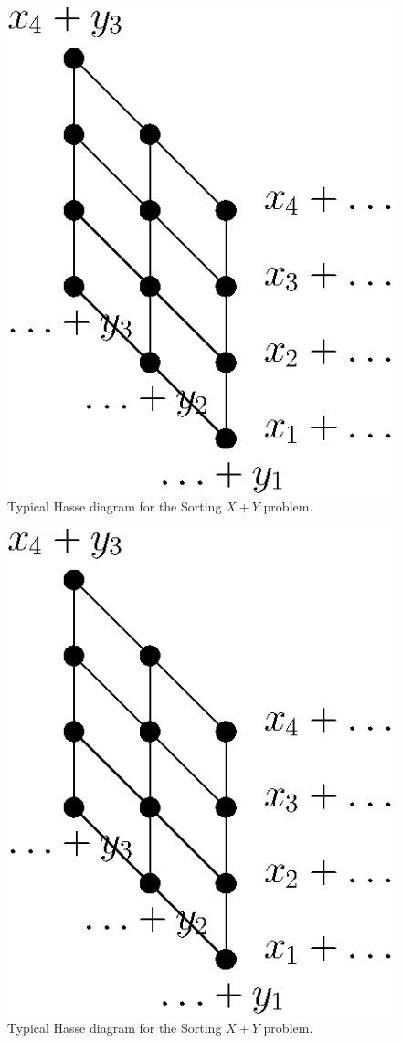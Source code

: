 \begin{figure}
	\centering
	\includegraphics[height=0.2\textheight]{fig/open/x+y}
	\caption{Typical Hasse diagram for the Sorting $X + Y$ problem.}
	\label{fig:xy:poset:antichains}
\end{figure}

\begin{figure}
	\centering
	\includegraphics[height=0.2\textheight]{fig/open/x+y}
	\caption{Typical Hasse diagram for the Sorting $X + Y$ problem.}
	\label{fig:xy:poset:compgraph}
\end{figure}

